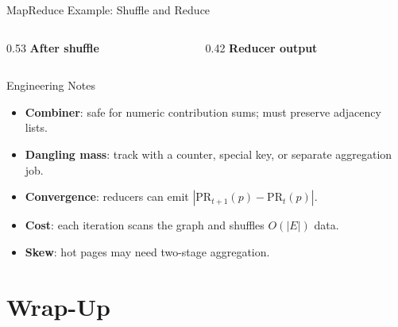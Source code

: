 \documentclass[aspectratio=169,11pt]{beamer}
\newcommand{\PR}{\mathrm{PR}}
\begin{document}
\begin{frame}{MapReduce Example: Shuffle and Reduce}
\begin{columns}[T,onlytextwidth]
\begin{column}{0.53\textwidth}
\small
\textbf{After shuffle}
\end{column}
\begin{column}{0.42\textwidth}
\small
\textbf{Reducer output}
\end{column}
\end{columns}
\end{frame}

\begin{frame}{Engineering Notes}
\begin{itemize}
  \item \textbf{Combiner}: safe for numeric contribution sums; must preserve adjacency lists.
  \item \textbf{Dangling mass}: track with a counter, special key, or separate aggregation job.
  \item \textbf{Convergence}: reducers can emit \(|\PR_{t+1}(p)-\PR_t(p)|\).
  \item \textbf{Cost}: each iteration scans the graph and shuffles \(O(|E|)\) data.
  \item \textbf{Skew}: hot pages may need two-stage aggregation.
\end{itemize}
\end{frame}

\section{Wrap-Up}
\end{document}
